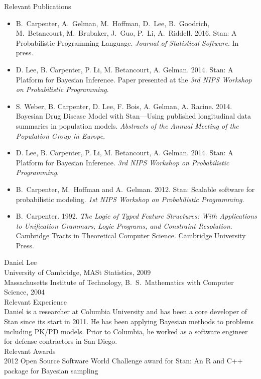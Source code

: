 \noindent
{\sc Relevant Publications}
\vspace*{-3pt}
\begin{itemize}
\item B.\ Carpenter, A.\ Gelman, M.\ Hoffman, D.\ Lee, B.\ Goodrich,
  M.\ Betancourt, M.\ Brubaker, J.\ Guo, P.\ Li, A.\ Riddell. 2016.
  Stan: A Probabilistic Programming Language. {\it Journal of
    Statistical Software}.  In press.
\item D. Lee, B. Carpenter, P. Li, M. Betancourt, A. Gelman. 2014. Stan: A
  Platform for Bayesian Inference.  Paper presented at the {\it 3rd
    NIPS Workshop on Probabilistic Programming}.
\item S. Weber, B. Carpenter, D. Lee, F. Bois, A. Gelman,
  A. Racine. 2014. Bayesian Drug Disease Model with Stan---Using published
  longitudinal data summaries in population models. {\it
    Abstracts of the Annual Meeting of the Population Group in
    Europe}.
\item D. Lee, B. Carpenter, P. Li, M. Betancourt, A. Gelman. 2014. Stan: A
  Platform for Bayesian Inference. {\it 3rd NIPS Workshop on
    Probabilistic Programming}.
\item B.~Carpenter, M.~Hoffman and A.~Gelman. 2012. Stan: Scalable
  software for probabilistic modeling.  {\it 1st NIPS Workshop on
    Probabilistic Programming}.
\item B.~Carpenter. 1992.  {\it The Logic of Typed Feature Structures:
    With Applications to Unification Grammars, Logic Programs, and
    Constraint Resolution}.  Cambridge Tracts in Theoretical Computer
  Science. Cambridge University Press.
\end{itemize}

\noindent
{\sc Daniel Lee}
\\[2pt]
University of Cambridge, MASt Statistics, 2009
\\
Massachusetts Institute of Technology, B.~S.\ Mathematics with Computer Science, 2004
\\

\noindent
{\sc Relevant Experience}
\\[2pt]
Daniel is a researcher at Columbia University and has been a core
developer of Stan since its start in 2011. He has been applying
Bayesian methods to problems including PK/PD models. Prior to Columbia,
he worked as a software engineer for defense contractors in San Diego.
\\

\noindent
{\sc Relevant Awards}
\\[2pt]
2012 Open Source Software World Challenge award
for Stan: An R and C++ package for Bayesian sampling \\

